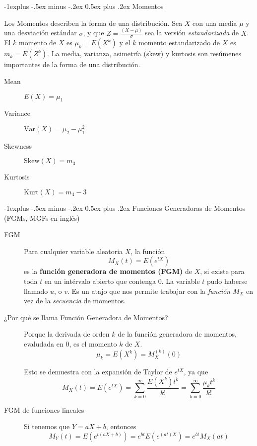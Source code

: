 \documentclass[12,landscape]{article}
\makeatletter
\newcommand{\var}{\textrm{Var}}
\renewcommand{\subsection}{\@startsection{subsection}{2}{0mm}%
                                {-1explus -.5ex minus -.2ex}%
                                {0.5ex plus .2ex}%
                                {\normalfont\normalsize\bfseries}}
\makeatother
\begin{document}
\begin{multicols*}{3}
\subsection{Momentos}

Los Momentos describen la forma de una distribución. Sea $X$ con una media $\mu$ y una desviación estándar $\sigma$, y que $Z=\frac{(X-\mu)}{\sigma}$ sea la versión \emph{estandarizada} de $X$. El $k$ momento de $X$ es $\mu_k = E(X^k)$ y el $k$ momento estandarizado de $X$ es $m_k = E(Z^k)$. La media, varianza, asimetría (skew) y kurtosis son resúmenes importantes de la forma de una distribución.
    \begin{description}
        \item[Mean] $E(X) = \mu_1 $
        \item[Variance] $\var(X) = \mu_2 - \mu_1^2$
        \item[Skewness] $\textrm{Skew}(X) = m_3$
      \item[Kurtosis] $\textrm{Kurt}(X) = m_4 - 3$
    \end{description}

\subsection{Funciones Generadoras de Momentos (FGMs, MGFs en inglés)}

\begin{description}
    \item[FGM] Para cualquier variable aleatoria $X$, la función
        \[ M_X(t) = E(e^{tX}) \]
        es la \textbf{función generadora de momentos (FGM)} de $X$, si existe para toda $t$ en un intérvalo abierto que contenga $0$. La variable $t$ pudo haberse llamado $u$, o $v$. Es un atajo que nos permite trabajar con la \emph{función} $M_X$ en vez de la \emph{secuencia} de momentos.
                
            \item[¿Por qué se llama Función Generadora de Momentos?] Porque la derivada de orden $k$ de la función generadora de momentos, evaludada en $0$, es el momento $k$ de $X$.
    \[\mu_k = E(X^k) = M_X^{(k)}(0)\]

    Esto se demuestra con la expansión de Taylor de $e^{tX}$, ya que
    \[M_X(t) = E(e^{tX}) = \sum_{k=0}^\infty \frac{E(X^k)t^k}{k!} = \sum_{k=0}^\infty \frac{\mu_k t^k}{k!} \]

    \item[FGM de funciones lineales] Si tenemos que $Y = aX + b$, entonces
        \[M_Y(t) = E(e^{t(aX + b)}) =  e^{bt}E(e^{(at)X}) = e^{bt}M_X(at)\]


\end{description}
\end{multicols*}
\end{document}
